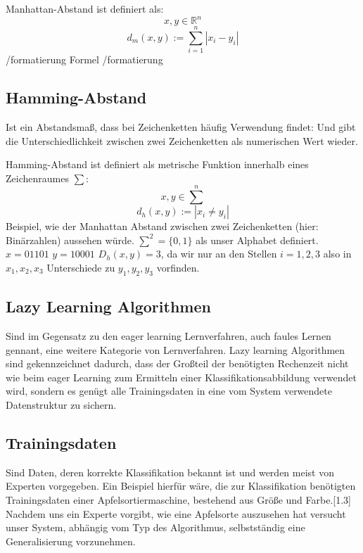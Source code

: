 \documentclass[a4paper]{scrartcl}
\begin{document}
\begin{multicols}{2}
                        Manhattan-Abstand ist definiert als:
                        $$
                            x,y \in \mathbb{R}^n 
                        $$
                        $$
                            d_m(x,y):= \sum_{i=1}^{n} |x_i -y_i|
                        $$
                        /formatierung
                        Formel
                        /formatierung
                         
                    \subsection{Hamming-Abstand}
                        Ist ein Abstandsmaß, dass bei Zeichenketten häufig Verwendung findet:
                        Und gibt die Unterschiedlichkeit zwischen zwei Zeichenketten als numerischen Wert wieder.
                        
                        Hamming-Abstand ist definiert als metrische Funktion innerhalb eines Zeichenraumes 
                        $\sum$:
	                    $$ x,y \in \sum^n $$
	                    $$ d_h(x,y):= |x_i \neq y_i |$$
                        Beispiel, wie der Manhattan Abstand zwischen zwei Zeichenketten (hier: Binärzahlen) aussehen würde.
                        $\sum^2=\{0,1\}$ als unser Alphabet definiert.
                        $x = 01101$
                        $y= 10001$
                        $D_h(x,y)=3$, da wir nur an den Stellen $i={1,2,3}$ also in $ x_1,x_2,x_3$ Unterschiede zu $y_1,y_2,y_3$ vorfinden.
                        
                    \subsection{Lazy Learning Algorithmen}
                        Sind im Gegensatz zu den eager learning Lernverfahren, auch faules Lernen gennant, eine weitere Kategorie von Lernverfahren. Lazy learning Algorithmen sind gekennzeichnet dadurch, dass der Großteil der benötigten Rechenzeit nicht wie beim eager Learning zum Ermitteln einer Klassifikationsabbildung verwendet wird, sondern es genügt alle Trainingsdaten in eine vom System verwendete Datenstruktur zu sichern. 
                    \subsection{Trainingsdaten} 
                        Sind Daten, deren korrekte Klassifikation bekannt ist und werden meist von Experten vorgegeben.
                        Ein Beispiel hierfür wäre, die zur Klassifikation benötigten Trainingsdaten einer Apfelsortiermaschine, bestehend aus Größe und Farbe.[1.3]
                        Nachdem uns ein Experte vorgibt, wie eine Apfelsorte auszusehen hat versucht unser System, abhängig vom Typ des Algorithmus, selbstständig eine Generalisierung vorzunehmen. 
                        

\end{multicols}
\end{document}
